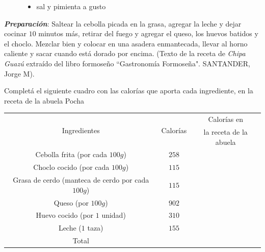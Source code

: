 \documentclass[10pt]{examdesign}
\begin{document}
\begin{shortanswer}[title={\textit{Receta que le dijo la Abuela Pocha a Ana y
				Juan.}},
		rearrange=no,resetcounter=no]
\begin{figure}[!h]
\begin{minipage}[b]{0.65\textwidth}
\begin{itemize}
					\item sal y pimienta a gusto
				\end{itemize}
			\end{minipage}
		\end{figure}
		\vspace{0.2cm}
		\textbf{\textit{\textcolor{upforestgreen}{Preparación}}}:
		\vspace{0.2cm}
		Saltear la cebolla picada en la grasa, agregar la leche y dejar cocinar $10$ minutos más, retirar del fuego y agregar el queso, los huevos batidos y el choclo. Mezclar bien y colocar en una asadera enmantecada, llevar al horno caliente y sacar cuando está dorado por encima. (\textcolor{dukeblue}{Texto de la receta de \textit{Chipa Guazú} extraído del libro formoseño “Gastronomía Formoseña". SANTANDER, Jorge M}).
		\begin{question}
			Completá el siguiente cuadro con las calorías que aporta cada ingrediente, en la receta de la abuela Pocha
			\begin{center}
				\begin{tabular}{|c|c|c|}
					\hline 
					\multirow{2}{*}{Ingredientes} &\multirow{2}{*}{Calorías }&
					Calorías en
					\\
					&&la receta de la abuela\\\hline  
					Cebolla frita (por cada $100g$)                  & $258$ &     
					\\\hline
					Choclo cocido (por cada $100g$)                  & $115$ &     
					\\\hline
					Grasa de cerdo (manteca de cerdo por cada $100g$)& $115$ &     
					\\\hline
					Queso (por $100g$)                               & $902$ &     
					\\\hline
					Huevo cocido (por $1$ unidad)                    & $310$ &     
					\\\hline
					Leche ($1$ taza)                                 & $155$ &     
					\\\hline
					Total                                            &       &     
					\\\hline
				\end{tabular}
			\end{center}

\end{question}
\end{shortanswer}
\end{document}
